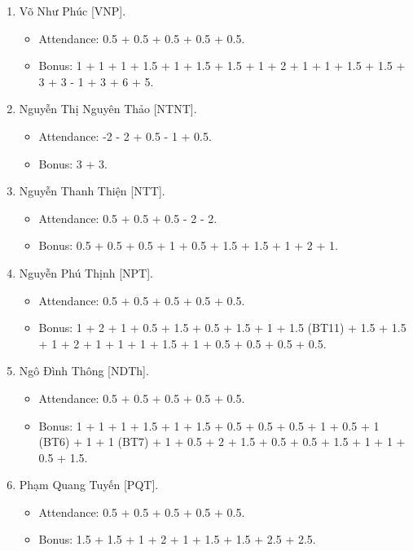 \documentclass{article}
\begin{document}
\begin{enumerate}
\begin{itemize}
    \end{itemize}
    \item {\sc Võ Như Phúc [VNP].}
    \begin{itemize}
        \item Attendance: 0.5 + 0.5 + 0.5 + 0.5 + 0.5.
        \item Bonus: 1 + 1 + 1 + 1.5 + 1 + 1.5 + 1.5 + 1 + 2 + 1 + 1 + 1.5 + 1.5 + 3 + 3 - 1 + 3 + 6 + 5.
    \end{itemize}
    \item {\sc Nguyễn Thị Nguyên Thảo [NTNT].}
    \begin{itemize}
        \item Attendance: -2 - 2 + 0.5 - 1 + 0.5.
        \item Bonus: 3 + 3.
    \end{itemize}
    \item {\sc Nguyễn Thanh Thiện [NTT].}
    \begin{itemize}
        \item Attendance: 0.5 + 0.5 + 0.5 - 2 - 2.
        \item Bonus: 0.5 + 0.5 + 0.5 + 1 + 0.5 + 1.5 + 1.5 + 1 + 2 + 1.
    \end{itemize}
    \item {\sc Nguyễn Phú Thịnh [NPT].}
    \begin{itemize}
        \item Attendance: 0.5 + 0.5 + 0.5 + 0.5 + 0.5.
        \item Bonus: 1 + 2 + 1 + 0.5 + 1.5 + 0.5 + 1.5 + 1 + 1.5 (BT11) + 1.5 + 1.5 + 1 + 2 + 1 + 1 + 1 + 1.5 + 1 + 0.5 + 0.5  + 0.5 + 0.5.
    \end{itemize}
    \item {\sc Ngô Đình Thông [NDTh].}
    \begin{itemize}
        \item Attendance: 0.5 + 0.5 + 0.5 + 0.5 + 0.5.
        \item Bonus: 1 + 1 + 1 + 1.5 + 1 + 1.5 + 0.5 + 0.5 + 0.5 + 1 + 0.5 + 1 (BT6) + 1 + 1 (BT7) + 1 + 0.5 + 2 + 1.5 + 0.5 + 0.5 + 1.5 + 1 + 1 + 0.5 + 1.5.
    \end{itemize}
    \item {\sc Phạm Quang Tuyến [PQT].}
    \begin{itemize}
        \item Attendance: 0.5 + 0.5 + 0.5 + 0.5 + 0.5.
        \item Bonus: 1.5 + 1.5 + 1 + 2 + 1 + 1.5 + 1.5 + 2.5 + 2.5.
    \end{itemize}
\end{enumerate}
\end{document}

